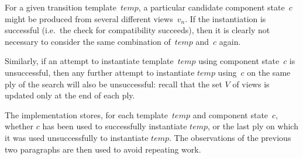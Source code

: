 \begin{opt}
For a given transition template~$temp$, a particular candidate component
state~$c$ might be produced from several different views~$v_n$.  If the
instantiation is successful (i.e.~the check for compatibility succeeds), then
it is clearly not necessary to consider the same combination of~$temp$ and~$c$
again.  

Similarly, if an attempt to instantiate template~$temp$ using component
state~$c$ is unsuccessful, then any further attempt to instantiate $temp$
using~$c$ on the same ply of the search will also be unsuccessful: recall that
the set $V$ of views is updated only at the end of each ply.

The implementation stores, for each template~$temp$ and component state~$c$,
whether $c$ has been used to successfully instantiate $temp$, or the last ply
on which it was used unsuccessfully to instantiate $temp$.  The observations
of the previous two paragraphs are then used to avoid repeating work.
\end{opt}
